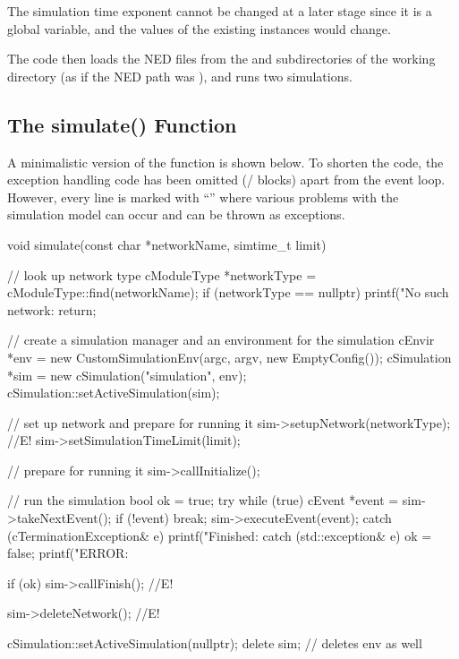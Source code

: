 \begin{note}
The simulation time exponent cannot be changed at a later stage since it is
a global variable, and the values of the existing  instances
would change.
\end{note}

The code then loads the NED files from the  and
 subdirectories of the working directory (as if the NED path
was ), and runs two simulations.


\subsection{The simulate() Function}
\label{sec:embedding:simulate-function}

A minimalistic version of the  function is shown below.
To shorten the code, the exception handling code has been omitted (/ blocks)
apart from the event loop. However, every line is marked with ``'' where various
problems with the simulation model can occur and can be thrown as exceptions.

\begin{cpp}
void simulate(const char *networkName, simtime_t limit)
{
    // look up network type
    cModuleType *networkType = cModuleType::find(networkName);
    if (networkType == nullptr) {
        printf("No such network: %
        return;
    }

    // create a simulation manager and an environment for the simulation
    cEnvir *env = new CustomSimulationEnv(argc, argv, new EmptyConfig());
    cSimulation *sim = new cSimulation("simulation", env);
    cSimulation::setActiveSimulation(sim);

    // set up network and prepare for running it
    sim->setupNetwork(networkType); //E!
    sim->setSimulationTimeLimit(limit);

    // prepare for running it
    sim->callInitialize();

    // run the simulation
    bool ok = true;
    try {
        while (true) {
            cEvent *event = sim->takeNextEvent();
            if (!event)
                break;
            sim->executeEvent(event);
        }
    }
    catch (cTerminationException& e) {
        printf("Finished: %
    }
    catch (std::exception& e) {
        ok = false;
        printf("ERROR: %
    }

    if (ok)
        sim->callFinish(); //E!

    sim->deleteNetwork(); //E!

    cSimulation::setActiveSimulation(nullptr);
    delete sim; // deletes env as well
}
\end{cpp}

